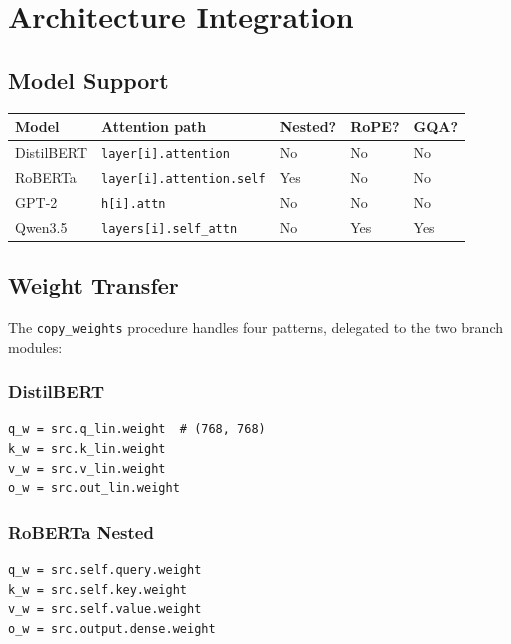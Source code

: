 \section{Architecture Integration}

\subsection{Model Support}

\begin{table}[H]
\centering
\small
\begin{tabular}{lllll}
\toprule
\textbf{Model} & \textbf{Attention path} & \textbf{Nested?} & \textbf{RoPE?} & \textbf{GQA?} \\
\midrule
DistilBERT & \texttt{layer[i].attention} & No & No & No \\
RoBERTa & \texttt{layer[i].attention.self} & Yes & No & No \\
GPT-2 & \texttt{h[i].attn} & No & No & No \\
Qwen3.5 & \texttt{layers[i].self\_attn} & No & Yes & Yes \\
\bottomrule
\end{tabular}
\end{table}

\subsection{Weight Transfer}

The \texttt{copy\_weights} procedure handles four patterns, delegated to the two 
branch modules:

\subsubsection{DistilBERT}

\begin{lstlisting}
q_w = src.q_lin.weight  # (768, 768)
k_w = src.k_lin.weight
v_w = src.v_lin.weight
o_w = src.out_lin.weight
\end{lstlisting}

\subsubsection{RoBERTa Nested}

\begin{lstlisting}
q_w = src.self.query.weight
k_w = src.self.key.weight
v_w = src.self.value.weight
o_w = src.output.dense.weight
\end{lstlisting}


